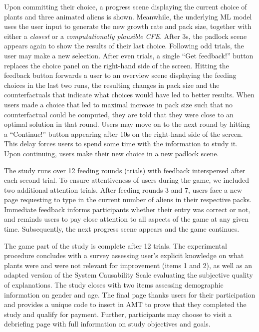 Upon committing their choice, a progress scene displaying the current choice of plants and three animated aliens is shown. 
Meanwhile, the underlying \gls{ML} model uses the user input to generate the new growth rate and pack size, together with either a \textit{closest} or a \textit{computationally plausible \gls{CFE}}.
After 3s, the padlock scene appears again to show the results of their last choice. 
Following odd trials, the user may make a new selection. 
After even trials, a single ``Get feedback!'' button replaces the choice panel on the right-hand side of the screen.
Hitting the feedback button forwards a user to an overview scene displaying the feeding choices in the last two runs, the resulting changes in pack size and the counterfactuals that indicate what choices would have led to better results. 
When users made a choice that led to maximal increase in pack size such that no counterfactual could be computed, they are told that they were close to an optimal solution in that round. 
Users may move on to the next round by hitting a ``Continue!'' button appearing after 10s on the right-hand side of the screen. This delay forces users to spend some time with the information to study it. Upon continuing, users make their new choice in a new padlock scene.

The study runs over 12 feeding rounds (trials) with feedback interspersed after each second trial. 
To ensure attentiveness of users during the game, we included two additional attention trials.
After feeding rounds 3 and 7, users face a new page requesting to type in the current number of aliens in their respective packs.
Immediate feedback informs participants whether their entry was correct or not, and reminds users to pay close attention to all aspects of the game at any given time.
Subsequently, the next progress scene appears and the game continues. 

The game part of the study is complete after 12 trials.
The experimental procedure concludes with a survey assessing user's explicit knowledge on what plants were and were not relevant for improvement (items 1 and 2), as well as an adapted version of the System Causability Scale \cite{holzinger_measuring_2020} evaluating the subjective quality of explanations.
The study closes with two items assessing demographic information on gender and age.
The final page thanks users for their participation and provides a unique code to insert in \gls{AMT} to prove that they completed the study and qualify for payment. 
Further, participants may choose to visit a debriefing page with full information on study objectives and goals. 

